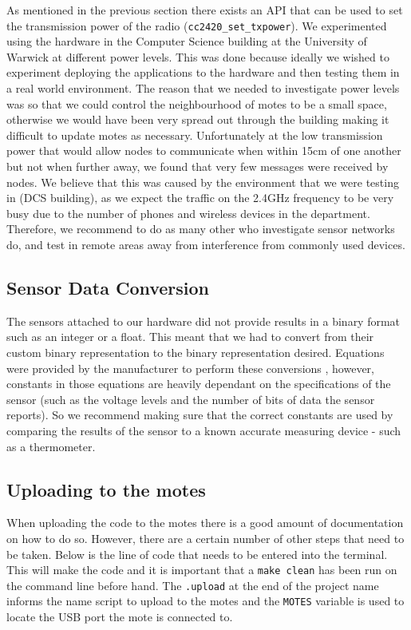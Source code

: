 As mentioned in the previous section there exists an API that can be used to set the transmission power of the radio (\verb|cc2420_set_txpower|). We experimented using the hardware in the Computer Science building at the University of Warwick at different power levels. This was done because ideally we wished to experiment deploying the applications to the hardware and then testing them in a real world environment. The reason that we needed to investigate power levels was so that we could control the neighbourhood of motes to be a small space, otherwise we would have been very spread out through the building making it difficult to update motes as necessary. Unfortunately at the low transmission power that would allow nodes to communicate when within 15cm of one another but not when further away, we found that very few messages were received by nodes. We believe that this was caused by the environment that we were testing in (DCS building), as we expect the traffic on the 2.4GHz frequency to be very busy due to the number of phones and wireless devices in the department. Therefore, we recommend to do as many other who investigate sensor networks do, and test in remote areas away from interference from commonly used devices.


\subsection{Sensor Data Conversion}

The sensors attached to our hardware did not provide results in a binary format such as an integer or a float. This meant that we had to convert from their custom binary representation to the binary representation desired. Equations were provided by the manufacturer to perform these conversions \cite{sensiriondatasheet}, however, constants in those equations are heavily dependant on the specifications of the sensor (such as the voltage levels and the number of bits of data the sensor reports). So we recommend making sure that the correct constants are used by comparing the results of the sensor to a known accurate measuring device - such as a thermometer.

\subsection{Uploading to the motes}

When uploading the code to the motes there is a good amount of documentation on how to do so. However, there are a certain number of other steps that need to be taken. Below is the line of code that needs to be entered into the terminal. This will make the code and it is important that a \verb|make clean| has been run on the command line before hand. The \verb|.upload| at the end of the project name informs the name script to upload to the motes and the \verb|MOTES| variable is used to locate the USB port the mote is connected to.

